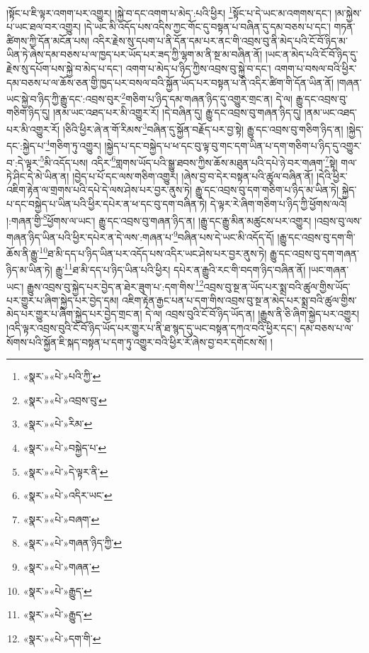 །སྟོང་པ་ཇི་ལྟར་འགག་པར་འགྱུར། །སྐྱེ་བ་དང་འགག་པ་མེད་:པའི་ཕྱིར། \footnote{«སྣར་»«པེ་»པའི་ཀྱི་}སྟོང་པ་དེ་ཡང་མ་འགགས་དང་། །མ་སྐྱེས་པ་ཡང་ཐལ་བར་འགྱུར། །དེ་ཡང་མི་འདོད་པས་འདིས་ཀྱང་གོང་དུ་བསྟན་པ་བཞིན་དུ་དམ་བཅས་པ་དང་། གཏན་ཚིགས་ཀྱི་དོན་མངོན་པས། འདིར་རྗེས་སུ་དཔག་པ་ནི་དོན་དམ་པར་ནང་གི་འབྲས་བུ་ནི་མེད་པའི་ངོ་བོ་ཉིད་མ་ཡིན་ཏེ་ཞེས་དམ་བཅས་པ་ལ་ཁྱད་པར་ཡོད་པར་ཟད་ཀྱི་ལྷག་མ་ནི་སྔ་མ་བཞིན་ནོ། །ཡང་ན་མེད་པའི་ངོ་བོ་ཉིད་དུ་རྗེས་སུ་དཔོག་པས་སྐྱེ་བ་མེད་པ་དང་། འགག་པ་མེད་པ་ཉིད་ཀྱིས་འབྲས་བུ་སྐྱེ་བ་དང་། འགག་པ་བསལ་བའི་ཕྱིར་དམ་བཅས་པ་ལ་ཆོས་ཅན་གྱི་ཁྱད་པར་བསལ་བའི་སྐྱོན་ཡོད་པར་བསྟན་པ་ནི་འདིར་ཚིག་གི་དོན་ཡིན་ནོ། །གཞན་ཡང་སྐྱེ་བ་ཉིད་ཀྱི་རྒྱུ་དང་:འབྲས་བུར་\footnote{«སྣར་»«པེ་»འབྲས་བུ་}གཅིག་པ་ཉིད་དམ་གཞན་ཉིད་དུ་འགྱུར་གྲང་ན། དེ་ལ། རྒྱུ་དང་འབྲས་བུ་གཅིག་ཉིད་དུ། །ནམ་ཡང་འཐད་པར་མི་འགྱུར་རོ། །དེ་བཞིན་དུ། རྒྱུ་དང་འབྲས་བུ་གཞན་ཉིད་དུ། །ནམ་ཡང་འཐད་པར་མི་འགྱུར་རོ། །ཅིའི་ཕྱིར་ཞེ་ན་གོ་རིམས་\footnote{«སྣར་»«པེ་»རིམ་}བཞིན་དུ་སྐྱོན་བརྗོད་པར་བྱ་སྟེ། རྒྱུ་དང་འབྲས་བུ་གཅིག་ཉིད་ན། །སྐྱེད་དང་:སྐྱེད་པ་\footnote{«སྣར་»«པེ་»བསྐྱེད་པ་}གཅིག་ཏུ་འགྱུར། །སྐྱེད་པ་དང་བསྐྱེད་པ་ཕ་དང་བུ་ལྟ་བུ་གང་དག་ཡིན་པ་དག་གཅིག་པ་ཉིད་དུ་འགྱུར་བ་:དེ་ལྟར་\footnote{«སྣར་»«པེ་»དེ་ལྟར་ནི་}མི་འདོད་པས། འདིར་\footnote{«སྣར་»«པེ་»འདིར་ཡང་}གླགས་ཡོད་པའི་སྒྱུ་ཐབས་ཀྱིས་ཆོས་མཐུན་པའི་དཔེ་ཉེ་བར་གཞག་\footnote{«སྣར་»«པེ་»བཞག་}སྟེ། གལ་ཏེ་ཤིང་དེ་མེ་ཡིན་ན། །བྱེད་པ་པོ་དང་ལས་གཅིག་འགྱུར། །ཞེས་བྱ་བ་དེར་བསྟན་པའི་ཚུལ་བཞིན་ནོ། །དེའི་ཕྱིར་འཇིག་རྟེན་ལ་གྲགས་པའི་དཔེ་དེ་ལས་ཤེས་པར་བྱར་ནུས་ཏེ། རྒྱུ་དང་འབྲས་བུ་དག་གཅིག་པ་ཉིད་མ་ཡིན་ཏེ། སྐྱེད་པ་དང་བསྐྱེད་པ་ཡིན་པའི་ཕྱིར་དཔེར་ན་ཕ་དང་བུ་དག་བཞིན་ཏེ། དེ་ལྟར་རེ་ཞིག་གཅིག་པ་ཉིད་ཀྱི་ཕྱོགས་ལའོ། །:གཞན་གྱི་\footnote{«སྣར་»«པེ་»གཞན་ཉིད་ཀྱི་}ཕྱོགས་ལ་ཡང་། རྒྱུ་དང་འབྲས་བུ་གཞན་ཉིད་ན། །རྒྱུ་དང་རྒྱུ་མིན་མཚུངས་པར་འགྱུར། །འབྲས་བུ་ལས་གཞན་ཉིད་ཡིན་པའི་ཕྱིར་དཔེར་ན་དེ་ལས་:གཞན་པ་\footnote{«སྣར་»«པེ་»གཞན་}བཞིན་པས་དེ་ཡང་མི་འདོད་དོ། །རྒྱུ་དང་འབྲས་བུ་དག་གི་ཆོས་ནི་རྒྱུ་\footnote{«སྣར་»«པེ་»རྒྱུད་}ཐ་མི་དད་པ་ཉིད་ཡིན་པར་འདོད་པས་འདིར་ཡང་ཤེས་པར་བྱར་ནུས་ཏེ། རྒྱུ་དང་འབྲས་བུ་དག་གཞན་ཉིད་མ་ཡིན་ཏེ། རྒྱུ་\footnote{«སྣར་»«པེ་»རྒྱུད་}ཐ་མི་དད་པ་ཉིད་ཡིན་པའི་ཕྱིར། དཔེར་ན་རྒྱུའི་རང་གི་བདག་ཉིད་བཞིན་ནོ། །ཡང་གཞན་ཡང་། རྒྱུས་འབྲས་བུ་སྐྱེད་པར་བྱེད་ན་ཐེར་ཟུག་པ་:དག་གིས་\footnote{«སྣར་»«པེ་»དག་གི་}འབྲས་བུ་སྔ་ན་ཡོད་པར་སྨྲ་བའི་ཚུལ་གྱིས་ཡོད་པར་གྱུར་པ་ཞིག་སྐྱེད་པར་བྱེད་དམ། འཇིག་རྟེན་རྒྱང་པན་པ་དག་གིས་འབྲས་བུ་སྔ་ན་མེད་པར་སྨྲ་བའི་ཚུལ་གྱིས་མེད་པར་གྱུར་པ་ཞིག་སྐྱེད་པར་བྱེད་གྲང་ན། དེ་ལ། འབྲས་བུའི་ངོ་བོ་ཉིད་ཡོད་ན། །རྒྱུས་ནི་ཅི་ཞིག་སྐྱེད་པར་འགྱུར། །འདི་ལྟར་འབྲས་བུའི་ངོ་བོ་ཉིད་ཡོད་པར་གྱུར་པ་ནི་ཐ་སྙད་དུ་ཡང་བསྟན་དཀའ་བའི་ཕྱིར་དང་། དམ་བཅས་པ་ལ་སོགས་པའི་སྐྱོན་ཇི་སྐད་བསྟན་པ་དག་ཏུ་འགྱུར་བའི་ཕྱིར་རོ་ཞེས་བྱ་བར་དགོངས་སོ། །
